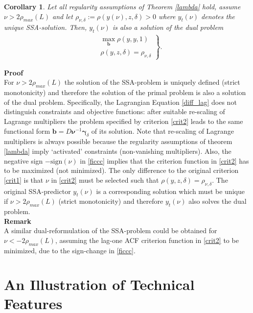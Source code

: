 \documentclass[a4paper]{article}
\newtheorem{Corollary}{Corollary}
\begin{document}
\begin{Corollary}\label{cor3}
Let all regularity assumptions of Theorem \eqref{lambda} hold, assume $\nu>2\rho_{max}(L)$  and let $\rho_{\nu,\delta}:=\rho(y(\nu),z,\delta)>0$ where $y_t(\nu)$ denotes the unique SSA-solution. Then, $y_t(\nu)$ is also a solution of the dual problem
\begin{eqnarray}\label{crit2}
\left.\begin{array}{cc}
&\max_{\mathbf{b}}\rho(y,y,1)\\
&\rho(y,z,\delta)=\rho_{\nu,\delta}
\end{array}\right\}.
\end{eqnarray}
\end{Corollary}
\textbf{Proof}\\
For $\nu>2\rho_{max}(L)$ the solution of the SSA-problem is uniquely defined (strict monotonicity) and therefore the solution of the primal problem is also a solution of the dual problem. Specifically, the Lagrangian Equation \ref{diff_lag} does not distinguish constraints and objective functions: after suitable re-scaling of Lagrange multipliers the problem specified by criterion \ref{crit2} leads to the same functional form $\mathbf{b}=D\boldsymbol{\nu}^{-1}\boldsymbol{\gamma}_{\delta}$ of its solution. Note that re-scaling of Lagrange multipliers is always possible because the regularity assumptions of theorem \ref{lambda} imply `activated' constraints (non-vanishing multipliers). Also, the negative sign $-\textrm{sign}(\nu)$ in \ref{ficcc} implies that the criterion function in \ref{crit2} has to be maximized (not minimized). The only difference to the original criterion \eqref{crit1} is that $\nu$ in \ref{crit2} must be selected such that $\rho(y,z,\delta)=\rho_{\nu,\delta}$. The original SSA-predictor $y_t(\nu)$ is a corresponding solution which must be unique if $\nu>2\rho_{max}(L)$ (strict monotonicity) and therefore $y_t(\nu)$ also solves the dual problem. \\

\textbf{Remark}\\
A similar dual-reformulation of the SSA-problem could be obtained for $\nu<-2\rho_{max}(L)$, assuming the lag-one ACF criterion function in \ref{crit2} to be minimized, due to the sign-change in \ref{ficcc}.





\section{An Illustration of Technical Features}\label{examples}
\end{document}
